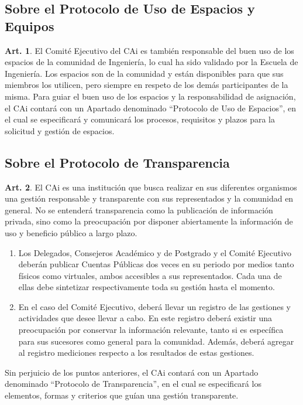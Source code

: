 \documentclass[letterpaper,11pt]{article}
\theoremstyle{definition}%
\newtheorem{art}{Art.} %
\begin{document}
\subsection*{Sobre el Protocolo de Uso de Espacios y Equipos}

\begin{art}\label{definicionProtocoloEspacios}
	El Comité Ejecutivo del CAi es también responsable del buen uso de los espacios de la comunidad de Ingeniería, lo cual ha sido validado por la Escuela de Ingeniería. Los espacios son de la comunidad y están disponibles para que sus miembros los utilicen, pero siempre en respeto de los demás participantes de la misma. Para guiar el buen uso de los espacios y la responsabilidad de asignación, el CAi contará con un Apartado denominado ``Protocolo de Uso de Espacios'', en el cual se especificará y comunicará los procesos, requisitos y plazos para la solicitud y gestión de espacios.
\end{art}

\subsection*{Sobre el Protocolo de Transparencia}

\begin{art}\label{definicionProtocoloTransparencia}
	El CAi es una institución que busca realizar en sus diferentes organismos una gestión responsable y transparente con sus representados y la comunidad en general. No se entenderá transparencia como la publicación de información privada, sino como la preocupación por disponer abiertamente la información de uso y beneficio público a largo plazo.
	\begin{enumerate}
		\item Los Delegados, Consejeros Académico y de Postgrado y el Comité Ejecutivo deberán publicar Cuentas Públicas dos veces en su periodo por medios tanto físicos como virtuales, ambos accesibles a sus representados. Cada una de ellas debe sintetizar respectivamente toda su gestión hasta el momento.
		\item En el caso del Comité Ejecutivo, deberá llevar un registro de las gestiones y actividades que desee llevar a cabo. En este registro deberá existir una preocupación por conservar la información relevante, tanto si es específica para sus sucesores como general para la comunidad. Además, deberá agregar al registro mediciones respecto a los resultados de estas gestiones.
	\end{enumerate}
	Sin perjuicio de los puntos anteriores, el CAi contará con un Apartado denominado ``Protocolo de Transparencia'', en el cual se especificará los elementos, formas y criterios que guían una gestión transparente.
\end{art}
\end{document}
